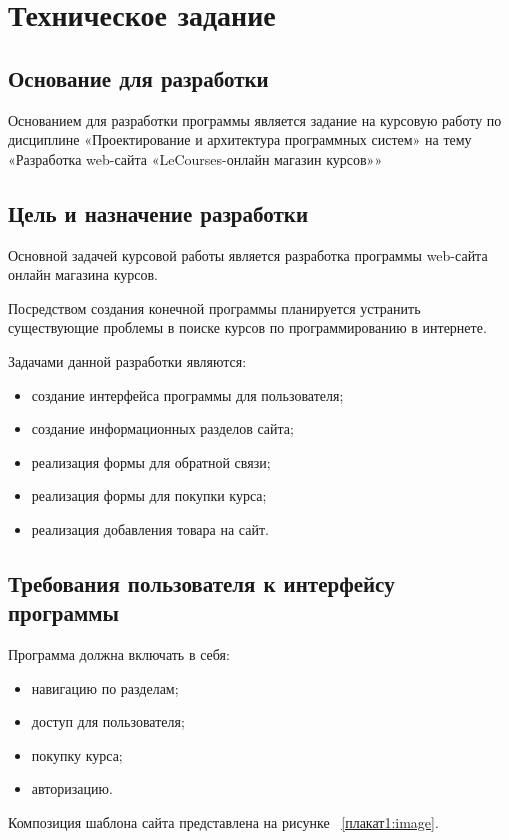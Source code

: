 \section{Техническое задание}
\subsection{Основание для разработки}

Основанием для разработки программы является задание на курсовую работу по дисциплине «Проектирование и архитектура программных систем» на тему «Разработка web-сайта «LeCourses-онлайн магазин курсов»»

\subsection{Цель и назначение разработки}

Основной задачей курсовой работы является разработка программы web-сайта онлайн магазина курсов.

Посредством создания конечной программы планируется устранить существующие проблемы в поиске курсов по программированию в интернете.

Задачами данной разработки являются:
\begin{itemize}
	\item создание интерфейса программы для пользователя;
	\item создание информационных разделов сайта;
	\item реализация формы для обратной связи;
	\item реализация формы для покупки курса;
	\item реализация добавления товара на сайт.
\end{itemize}

\subsection{Требования пользователя к интерфейсу программы}

Программа должна включать в себя:
\begin{itemize}
	\item навигацию по разделам;
	\item доступ для пользователя;
	\item покупку курса;
	\item авторизацию.
\end{itemize}

Композиция шаблона сайта представлена на рисунке ~\ref{плакат1:image}.

